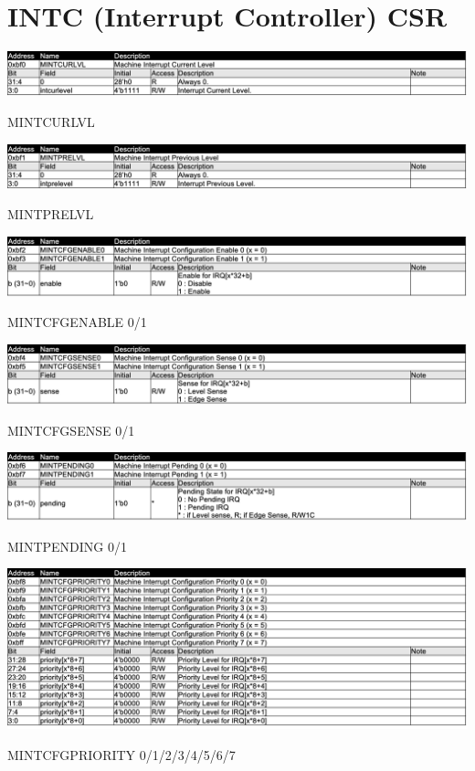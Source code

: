 \section{INTC (Interrupt Controller) CSR}

\begin{table}[H]
    \includegraphics[width=1.00\columnwidth]{./Table/MINTCURLVL.png}
    \caption{MINTCURLVL}
    \label{tb:MINTCURLVL}
\end{table}

\begin{table}[H]
    \includegraphics[width=1.00\columnwidth]{./Table/MINTPRELVL.png}
    \caption{MINTPRELVL}
    \label{tb:MINTPRELVL}
\end{table}

\begin{table}[H]
    \includegraphics[width=1.00\columnwidth]{./Table/MINTCFGENABLE.png}
    \caption{MINTCFGENABLE 0/1}
    \label{tb:MINTCFGENABLE}
\end{table}

\begin{table}[H]
    \includegraphics[width=1.00\columnwidth]{./Table/MINTCFGSENSE.png}
    \caption{MINTCFGSENSE 0/1}
    \label{tb:MINTCFGSENSE}
\end{table}

\begin{table}[H]
    \includegraphics[width=1.00\columnwidth]{./Table/MINTPENDING.png}
    \caption{MINTPENDING 0/1}
    \label{tb:MINTPENDING}
\end{table}

\begin{table}[H]
    \includegraphics[width=1.00\columnwidth]{./Table/MINTCFGPRIORITY.png}
    \caption{MINTCFGPRIORITY 0/1/2/3/4/5/6/7}
    \label{tb:MINTCFGPRIORITY}
\end{table}

